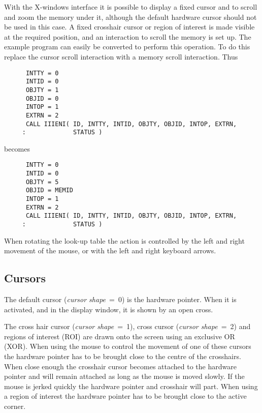 With the X-windows interface it is possible to display a fixed cursor
and to scroll and zoom the memory under it, although the default hardware
cursor should not be used in this case. A fixed crosshair cursor or region
of interest is made visible at the required position, and an interaction
to scroll the memory is set up. The example program can easily be converted
to perform this operation. To do this replace the cursor scroll interaction
with a memory scroll interaction. Thus
\begin{small}
\begin{verbatim}
      INTTY = 0
      INTID = 0
      OBJTY = 1
      OBJID = 0
      INTOP = 1
      EXTRN = 2
      CALL IIIENI( ID, INTTY, INTID, OBJTY, OBJID, INTOP, EXTRN,
     :             STATUS )
\end{verbatim}
\end{small}
becomes
\begin{small}
\begin{verbatim}
      INTTY = 0
      INTID = 0
      OBJTY = 5
      OBJID = MEMID
      INTOP = 1
      EXTRN = 2
      CALL IIIENI( ID, INTTY, INTID, OBJTY, OBJID, INTOP, EXTRN,
     :             STATUS )
\end{verbatim}
\end{small}

When rotating the look-up table the action is controlled by the left
and right movement of the mouse, or with the left and right keyboard
arrows.

\subsection{Cursors}

The default cursor ({\it cursor shape}~=~0) is the hardware pointer. When
it is activated, and in the display window, it is shown by an open cross.

The cross hair cursor ({\it cursor shape}~=~1), cross cursor ({\it cursor
shape}~=~2) and regions of interest (ROI) are drawn onto the screen using
an exclusive OR (XOR).
When using the mouse to control the movement of one of these cursors the
hardware pointer has to be brought close to the centre of the crosshairs.
When close enough the crosshair cursor becomes attached to the hardware
pointer and will remain attached as long as the mouse is moved slowly.
If the mouse is jerked quickly the hardware pointer and crosshair
will part. When using a region of interest the hardware pointer has
to be brought close to the active corner.

